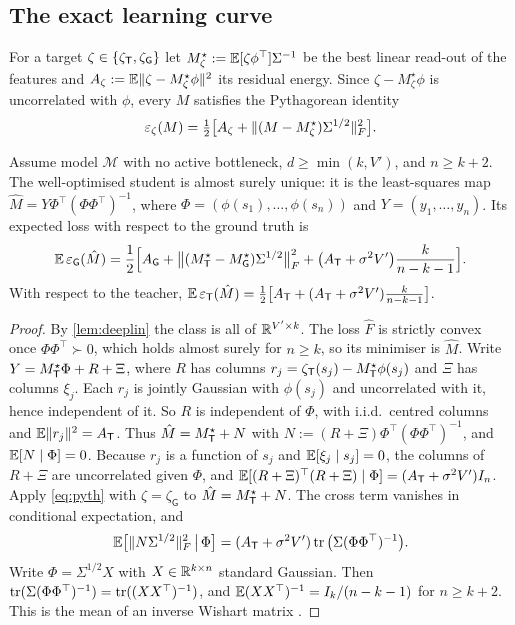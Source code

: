 \subsection{The exact learning curve}\label{sec:law-curve}

For a target $\zeta\in\{\zeta_{\mathsf{T}},\zeta_{\mathsf G}\}$ let $M^\star_\zeta:=\mathbb{E}[\zeta\phi^\top]\Sigma^{-1}$ be the best linear read-out of the
features and $A_\zeta:=\mathbb{E}\|\zeta-M^\star_\zeta\phi\|^2$ its residual energy. Since $\zeta-M^\star_\zeta\phi$ is uncorrelated with $\phi$,
every $M$ satisfies the Pythagorean identity
\begin{equation}\label{eq:pyth}
\varepsilon_\zeta(M)=\tfrac12\big[A_\zeta+\|(M-M^\star_\zeta)\Sigma^{1/2}\|_F^2\big].
\end{equation}

\begin{theorem}\label{thm:curve}
\Mo\Ck Assume model $\mathcal M$ with no active bottleneck, $d\ge\min(k,V')$, and $n\ge k+2$. The well-optimised
student is almost surely unique: it is the least-squares map $\hat M=Y\Phi^\top(\Phi\Phi^\top)^{-1}$, where
$\Phi=(\phi(s_1),\dots,\phi(s_n))$ and $Y=(y_1,\dots,y_n)$. Its expected loss with respect to the ground truth is
\[
\mathbb{E}\,\varepsilon_{\mathsf G}(\hat M)=\frac12\Big[A_{\mathsf G}+\big\|(M^\star_{\mathsf{T}}-M^\star_{\mathsf G})\Sigma^{1/2}\big\|_F^2+\big(A_{\mathsf{T}}+\sigma^2V'\big)\frac{k}{n-k-1}\Big].
\]
With respect to the teacher, $\mathbb{E}\,\varepsilon_{\mathsf{T}}(\hat M)=\frac12\big[A_{\mathsf{T}}+(A_{\mathsf{T}}+\sigma^2V')\frac k{n-k-1}\big]$.
\end{theorem}
\begin{proof}
By \cref{lem:deeplin} the class is all of $\mathbb{R}^{V'\times k}$. The loss $\hat F$ is strictly convex once $\Phi\Phi^\top\succ0$,
which holds almost surely for $n\ge k$, so its minimiser is $\hat M$. Write $Y=M^\star_{\mathsf{T}}\Phi+R+\Xi$, where $R$ has
columns $r_j=\zeta_{\mathsf{T}}(s_j)-M^\star_{\mathsf{T}}\phi(s_j)$ and $\Xi$ has columns $\xi_j$. Each $r_j$ is jointly Gaussian with $\phi(s_j)$ and
uncorrelated with it, hence independent of it. So $R$ is independent of $\Phi$, with i.i.d.\ centred columns and
$\mathbb{E}\|r_j\|^2=A_{\mathsf{T}}$. Thus $\hat M=M^\star_{\mathsf{T}}+N$ with $N:=(R+\Xi)\Phi^\top(\Phi\Phi^\top)^{-1}$, and $\mathbb{E}[N\mid\Phi]=0$. Because $r_j$ is
a function of $s_j$ and $\mathbb{E}[\xi_j\mid s_j]=0$, the columns of $R+\Xi$ are uncorrelated given $\Phi$, and
$\mathbb{E}[(R+\Xi)^\top(R+\Xi)\mid\Phi]=(A_{\mathsf{T}}+\sigma^2V')I_n$.
Apply \eqref{eq:pyth} with $\zeta=\zeta_{\mathsf G}$ to $\hat M=M^\star_{\mathsf{T}}+N$. The cross term vanishes in conditional expectation, and
\[
\mathbb{E}\big[\|N\Sigma^{1/2}\|_F^2\,\big|\,\Phi\big]=(A_{\mathsf{T}}+\sigma^2V')\operatorname{tr}\big(\Sigma(\Phi\Phi^\top)^{-1}\big).
\]
Write $\Phi=\Sigma^{1/2}X$ with $X\in\mathbb{R}^{k\times n}$ standard Gaussian. Then $\operatorname{tr}(\Sigma(\Phi\Phi^\top)^{-1})=\operatorname{tr}((XX^\top)^{-1})$, and
$\mathbb{E}(XX^\top)^{-1}=I_k/(n-k-1)$ for $n\ge k+2$. This is the mean of an inverse Wishart matrix
\citep[Thm.~3.2.12]{muirhead1982aspects}.
\end{proof}

